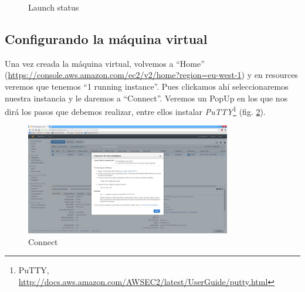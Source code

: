 \documentclass[a4paper,10pt]{scrartcl}
\begin{document}
\begin{enumerate}
\begin{figure}[htb!]
		\caption{Launch status}
		\label{fig: succes}
	\end{figure}
\end{enumerate}

\subsection{Configurando la máquina virtual}
Una vez creada la máquina virtual, volvemos a ``Home'' (\url{https://console.aws.amazon.com/ec2/v2/home?region=eu-west-1}) y en resources veremos que tenemos ``1 running instance''. Pues clickamos ahí seleccionaremos nuestra instancia y le daremos a ``Connect''. Veremos un PopUp en los que nos dirá los pasos que debemos realizar, entre ellos instalar \emph{PuTTY}\footnote{PuTTY, \url{http://docs.aws.amazon.com/AWSEC2/latest/UserGuide/putty.html}} (fig. \ref{fig: connect}).
	\begin{figure}[htb!]
		\centering
		\includegraphics[width=0.8\textwidth] {connect.png}
		\caption{Connect}
		\label{fig: connect}
	\end{figure}
	
\end{document}
